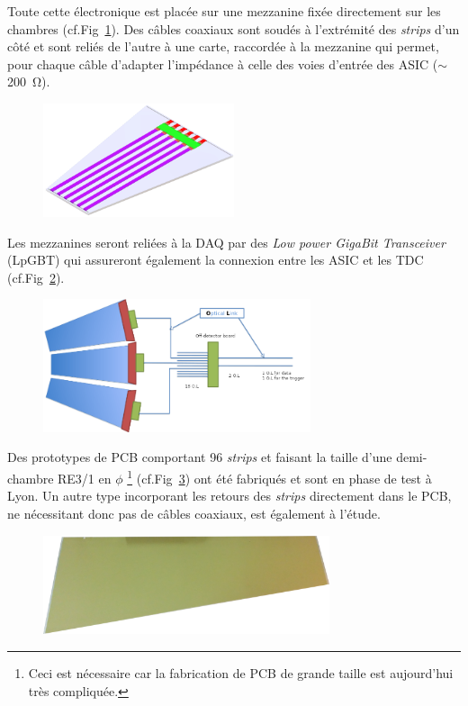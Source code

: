 Toute cette électronique est placée sur une mezzanine fixée directement sur les chambres (cf.Fig~\ref{chamber}). Des câbles coaxiaux sont soudés à l'extrémité des \textit{strips} d'un côté et sont reliés de l'autre à une carte, raccordée à la mezzanine qui permet, pour chaque câble d'adapter l'impédance à celle des voies d'entrée des ASIC ($\sim$\SI{200}{\ohm}).  

\begin{figure}[ht!]
	\centering
	\includegraphics[width=0.50\textwidth]{CON/chambre.png}
	\label{chamber}
\end{figure}

Les mezzanines seront reliées à la DAQ par des \textit{Low power GigaBit Transceiver} (LpGBT) qui assureront également la connexion entre les ASIC et les TDC (cf.Fig~\ref{chambres}). 

\begin{figure}[ht!]
	\centering
	\includegraphics[width=0.70\textwidth]{CON/chambres.png}
	\label{chambres}
\end{figure}

Des prototypes de PCB comportant \num{96} \textit{strips} et faisant la taille d'une demi-chambre RE3/1 en $\phi$ \footnote{Ceci est nécessaire car la fabrication de PCB de grande taille est aujourd'hui très compliquée.} (cf.Fig~\ref{proto}) ont été fabriqués et sont en phase de test à Lyon. Un autre type incorporant les retours des \textit{strips} directement dans le PCB, ne nécessitant donc pas de câbles coaxiaux, est également à l'étude.

\begin{figure}[ht!]
	\centering
	\includegraphics[width=0.75\textwidth]{CON/proto.png}
	\label{proto}
\end{figure}